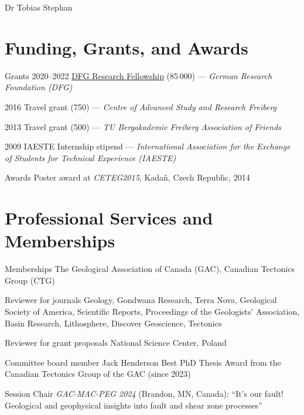 \documentclass[10pt, paper=letter]{scrartcl} %
\begin{document}
\begin{cv}{\textsf{Dr Tobias Stephan}}
    \section{Funding, Grants, and Awards}
    \begin{cvlist}{}
        \item[Grants] 2020--2022
        \href{https://gepris.dfg.de/gepris/projekt/439621066?language=en}{DFG Research
            Fellowship} (85\,000\texteuro) --- \textit{German Research Foundation (DFG)}
        \item[] 2016 Travel grant (750\texteuro) --- \textit{Centre of Advanced Study and Research Freiberg}
        \item 2013 Travel grant (500\texteuro) --- \textit{TU Bergakademie Freiberg Association of Friends}
        \item 2009 IAESTE Internship stipend --- \textit{International Association for the Exchange of Students for Technical Experience
            (IAESTE)}
        \item[Awards] Poster award at \textit{CETEG2015}, Kada\v{n}, Czech Republic, 2014
    \end{cvlist}

    \section{Professional Services and Memberships}
    \begin{cvlist}{}
        \item[Memberships] The Geological Association of Canada (GAC), Canadian Tectonics
        Group (CTG)%
        \item[Reviewer for journals] Geology, Gondwana Research, Terra Nova, Geological
        Society of America, Scientific Reports, Proceedings of the Geologists'
        Association, Basin Research, Lithosphere, Discover Geoscience, Tectonics
        \item[Reviewer for grant proposals] National Science Center, Poland
        \item[Committee board member] Jack Henderson Best PhD Thesis Award from the Canadian
        Tectonics Group of the GAC (since 2023)
        \item[Session Chair] \textit{GAC-MAC-PEG 2024} (Brandon, MN, Canada): \enquote{It’s
            our fault! Geological and geophysical insights into fault and shear zone
            processes}
    \end{cvlist}


\end{cv}
\end{document}
